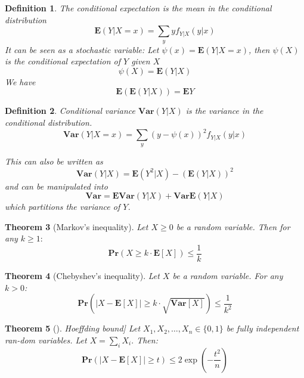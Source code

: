 \documentclass[11pt]{article}
\newcommand{\Ppb}{\mathbf{Pr}}
\newcommand{\Es}{\mathbf{E}}
\newcommand{\Var}{\mathbf{Var}}
\newtheorem{theorem}{Theorem}
\newtheorem{definition}[theorem]{Definition}
\begin{document}
\begin{definition}
The conditional expectation is the mean in the conditional distribution
\begin{equation}
\Es(Y | X=x)=\sum_{y} y f_{Y | X}(y | x)
\end{equation}
It can be seen as a stochastic variable: Let $\psi(x)=\Es(Y | X=x)$,
then $\psi(X)$ is the conditional expectation of $Y$ given $X$
\begin{equation}
\psi(X)=\Es(Y | X)
\end{equation}
We have
\begin{equation}
\Es(\Es(Y | X))=\Es Y
\end{equation}
\end{definition}

\begin{definition}
Conditional variance $\Var(Y|X)$ is the variance in the conditional distribution.
\begin{equation}
\Var(Y | X=x)=\sum_{y}(y-\psi(x))^{2} f_{Y | X}(y | x)
\end{equation}

This can also be written as
$$
\Var(Y | X)=\Es\left(Y^{2} | X\right)-(\Es(Y | X))^{2}
$$
and can be manipulated into
$$
\Var=\Es \Var(Y | X)+\Var \Es(Y | X)
$$
which partitions the variance of $Y$.
\end{definition}

\begin{theorem}[Markov's inequality]
Let $X \geq 0$ be a random variable. Then for any $k \geq 1:$
\begin{equation}
\Ppb(X \geq k \cdot \Es[X]) \leq \frac{1}{k}
\end{equation}
\end{theorem}
\begin{theorem}[Chebyshev's inequality]
Let $X$ be a random variable. For any $k>0$:
\begin{equation}
\Ppb(|X-\Es[X]| \geq k \cdot \sqrt{\Var[X]}) \leq \frac{1}{k^{2}}
\end{equation}
\end{theorem}
\begin{theorem}[]Hoeffding bound]
Let $X_{1}, X_{2}, \ldots, X_{n} \in\{0,1\}$ be fully independent ran-dom variables. Let $X=\sum_{i} X_{i} .$ Then:
\begin{equation}
    \Ppb(|X-\Es[X]| \geq t) \leq 2 \exp \left(-\frac{t^{2}}{n}\right)
\end{equation}
\end{theorem}
\end{document}
